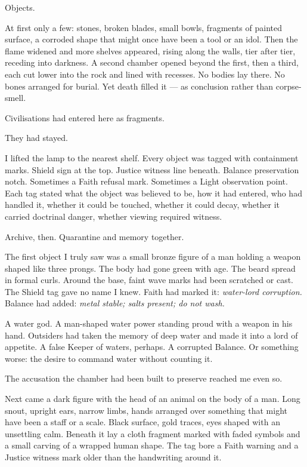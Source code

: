 Objects.\par

At first only a few: stones, broken blades, small bowls, fragments of painted surface, a corroded shape that might once have been a tool or an idol. Then the flame widened and more shelves appeared, rising along the walls, tier after tier, receding into darkness. A second chamber opened beyond the first, then a third, each cut lower into the rock and lined with recesses. No bodies lay there. No bones arranged for burial. Yet death filled it --- as conclusion rather than corpse-smell.\par

Civilisations had entered here as fragments.\par

They had stayed.\par

I lifted the lamp to the nearest shelf. Every object was tagged with containment marks. Shield sign at the top. Justice witness line beneath. Balance preservation notch. Sometimes a Faith refusal mark. Sometimes a Light observation point. Each tag stated what the object was believed to be, how it had entered, who had handled it, whether it could be touched, whether it could decay, whether it carried doctrinal danger, whether viewing required witness.\par

Archive, then. Quarantine and memory together.\par

The first object I truly saw was a small bronze figure of a man holding a weapon shaped like three prongs. The body had gone green with age. The beard spread in formal curls. Around the base, faint wave marks had been scratched or cast. The Shield tag gave no name I knew. Faith had marked it: \textit{water-lord corruption.} Balance had added: \textit{metal stable; salts present; do not wash.}\par

A water god. A man-shaped water power standing proud with a weapon in his hand. Outsiders had taken the memory of deep water and made it into a lord of appetite. A false Keeper of waters, perhaps. A corrupted Balance. Or something worse: the desire to command water without counting it.\par

The accusation the chamber had been built to preserve reached me even so.\par

Next came a dark figure with the head of an animal on the body of a man. Long snout, upright ears, narrow limbs, hands arranged over something that might have been a staff or a scale. Black surface, gold traces, eyes shaped with an unsettling calm. Beneath it lay a cloth fragment marked with faded symbols and a small carving of a wrapped human shape. The tag bore a Faith warning and a Justice witness mark older than the handwriting around it.\par

